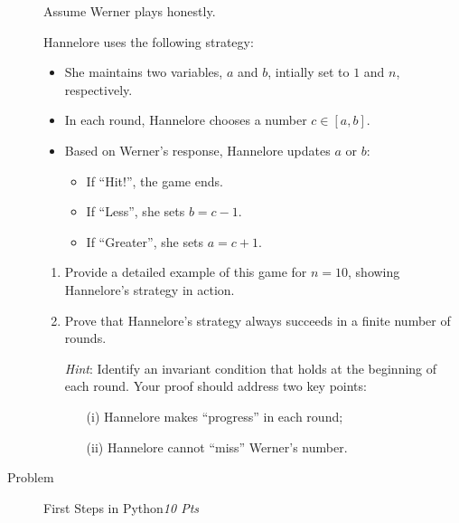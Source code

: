 \documentclass[a4paper,twoside,12pt]{article}
\newcounter{AUFGNR}
\newcommand{\AUFGABE}[2]{\vspace{0.3cm}\item[Problem \arabic{AUFGNR}]\stepcounter{AUFGNR} #1\hfill\emph{#2}}
\begin{document}
\begin{description}
Assume Werner plays honestly.

Hannelore uses the following strategy:
\begin{itemize}
\item She maintains two variables, $a$ and $b$, intially set to $1$ and $n$, respectively.
\item In each round, Hannelore chooses a number $c\in\left[ a,b \right]$.
\item Based on Werner's response, Hannelore updates $a$ or $b$:
  \begin {itemize}
  \item If ``Hit!'', the game ends.
  \item If ``Less'', she sets $b = c-1$.
  \item If ``Greater'', she sets $a = c + 1$.
  \end {itemize}
\end{itemize}

\begin{enumerate}
  \item Provide a detailed example of this game for $n = 10$, showing
    Hannelore's strategy in action.
  \item Prove that Hannelore's strategy always succeeds in a finite number of rounds.

  \emph{Hint}: 
  Identify an invariant condition that holds at the beginning of each round.
  Your proof should address two key points:
  \begin{enumerate}
      \item[(i)] Hannelore makes ``progress'' in each round;
      \item[(ii)] Hannelore cannot ``miss'' Werner's number.
  \end{enumerate}
\end{enumerate}


\AUFGABE{First Steps in Python}{10 Pts}


\end{description}
\end{document}
